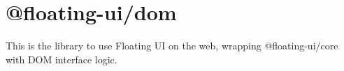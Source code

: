 \chapter{@floating-\/ui/dom}
\hypertarget{md__2home_2solype_2delivery_2current__days_2Mannheim_2front_2node__modules_2_0dfloating-ui_2dom_2README}{}\label{md__2home_2solype_2delivery_2current__days_2Mannheim_2front_2node__modules_2_0dfloating-ui_2dom_2README}
\label{md__2home_2solype_2delivery_2current__days_2Mannheim_2front_2node__modules_2_0dfloating-ui_2dom_2README_autotoc_md277}%
%
 This is the library to use Floating UI on the web, wrapping {\ttfamily @floating-\/ui/core} with DOM interface logic. 